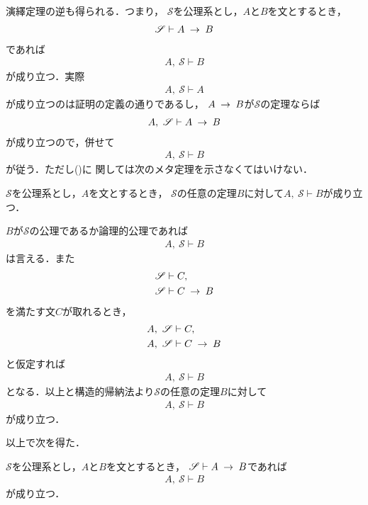 	演繹定理の逆も得られる．つまり，
	$\mathscr{S}$を公理系とし，$A$と$B$を文とするとき，
	\begin{align}
		\mathscr{S} \vdash A \hspace{0.25em}\rightarrow\hspace{0.25em} B
	\end{align}
	であれば
	\begin{align}
		A,\ \mathscr{S} \vdash B
	\end{align}
	が成り立つ．実際
	\begin{align}
		A,\ \mathscr{S} \vdash A
	\end{align}
	が成り立つのは証明の定義の通りであるし，
	$A \hspace{0.25em}\rightarrow\hspace{0.25em} B$が$\mathscr{S}$の定理ならば
	\begin{align}
		A,\ \mathscr{S} \vdash A \hspace{0.25em}\rightarrow\hspace{0.25em} B
		\label{fom:inversion_of_deduction_theorem}
	\end{align}
	が成り立つので，併せて
	\begin{align}
		A,\ \mathscr{S} \vdash B
	\end{align}
	が従う．ただし()に
	関しては次のメタ定理を示さなくてはいけない．
	
	\begin{screen}
		\begin{metathm}[公理が増えても証明可能]
			$\mathscr{S}$を公理系とし，$A$を文とするとき，
			$\mathscr{S}$の任意の定理$B$に対して$A,\ \mathscr{S} \vdash B$が成り立つ．
		\end{metathm}
	\end{screen}
	
	\begin{metaprf}
		$B$が$\mathscr{S}$の公理であるか論理的公理であれば
		\begin{align}
			A,\ \mathscr{S} \vdash B
		\end{align}
		は言える．また
		\begin{align}
			\mathscr{S} &\vdash C, \\
			\mathscr{S} &\vdash C \hspace{0.25em}\rightarrow\hspace{0.25em} B
		\end{align}
		を満たす文$C$が取れるとき，
		\begin{align}
			A,\ \mathscr{S} &\vdash C, \\
			A,\ \mathscr{S} &\vdash C \hspace{0.25em}\rightarrow\hspace{0.25em} B
		\end{align}
		と仮定すれば
		\begin{align}
			A,\ \mathscr{S} \vdash B
		\end{align}
		となる．以上と構造的帰納法より$\mathscr{S}$の任意の定理$B$に対して
		\begin{align}
			A,\ \mathscr{S} \vdash B
		\end{align}
		が成り立つ．
		\QED
	\end{metaprf}
	
	以上で次を得た．
	\begin{screen}
		\begin{metathm}[演繹定理の逆]
		\label{metathm:inverse_of_deduction_theorem}
			$\mathscr{S}$を公理系とし，$A$と$B$を文とするとき，
			$\mathscr{S} \vdash A \hspace{0.25em}\rightarrow\hspace{0.25em} B$であれば
			\begin{align}
				A,\ \mathscr{S} \vdash B
			\end{align}
			が成り立つ．
		\end{metathm}
	\end{screen}